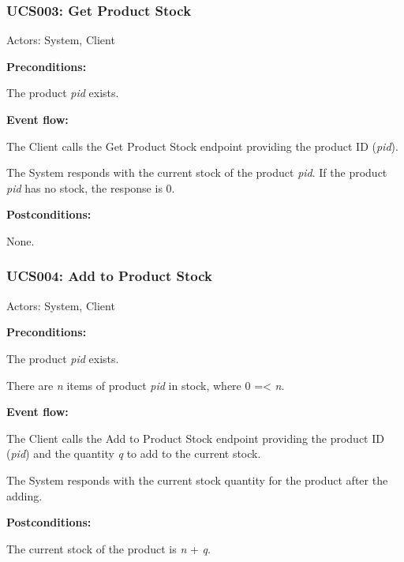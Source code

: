 \begin{ucbox}{\subsubsection{UCS003: Get Product Stock}}
\label{UCS003}

Actors: System, Client

\textbf{Preconditions:}

\ucitem The product \textit{pid} exists.

\textbf{Event flow:}

\ucitem The Client calls the Get Product Stock endpoint providing the product ID (\textit{pid}).

\ucitem The System responds with the current stock of the product \textit{pid}. If the product \textit{pid} has no stock, the response is 0.

\textbf{Postconditions:}

\ucitem None.

\end{ucbox}

\begin{ucbox}{\subsubsection{UCS004: Add to Product Stock}}
\label{UCS004}

Actors: System, Client

\textbf{Preconditions:}

\ucitem The product \textit{pid} exists.

\ucitem There are \textit{n} items of product \textit{pid} in stock, where 0 =< \textit{n}. 

\textbf{Event flow:}

\ucitem The Client calls the Add to Product Stock endpoint providing the product ID (\textit{pid}) and the quantity \textit{q} to add to the current stock.

\ucitem The System responds with the current stock quantity for the product after the adding.

\textbf{Postconditions:}

\ucitem The current stock of the product is \textit{n} + \textit{q}.

\end{ucbox}

